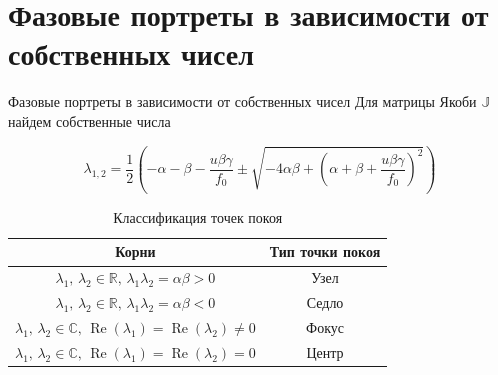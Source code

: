 \documentclass{beamer}
\begin{document}
		
	\section{Фазовые портреты в зависимости от собственных чисел}
	\begin{frame}{Фазовые портреты в зависимости от собственных чисел}
	Для матрицы Якоби $\mathbb{J}$ найдем собственные числа
\begin{block}{}
\[
	\lambda_{1,2}=\frac{1}{2}\left(-\alpha-\beta-\frac{u\beta\gamma}{f_0}\pm\sqrt{-4\alpha\beta+\left(\alpha+\beta+\frac{u\beta\gamma}{f_0}\right)^2}\right)
\]
\end{block}
\begin{table}[H]
	\centering		
		\captionsetup{labelformat=empty}
	\caption{Классификация точек покоя}
	\begin{tabular}{|c|c|}
		\hline
		Корни  & Тип точки покоя \\
		\hline
		$\lambda_1,\,\lambda_2\in\mathbb{R}\text{, } \lambda_1\lambda_2=\alpha\beta>0$& Узел\\
		\hline
		$\lambda_1,\,\lambda_2\in\mathbb{R}\text{, } \lambda_1\lambda_2=\alpha\beta<0$& Седло\\
		\hline
		$\lambda_1,\,\lambda_2\in\mathbb{C}\text{, }\operatorname{Re}(\lambda_1)=\operatorname{Re}(\lambda_2)\ne0$ & Фокус\\
		\hline
		$\lambda_1,\,\lambda_2\in\mathbb{C}\text{, }\operatorname{Re}(\lambda_1)=\operatorname{Re}(\lambda_2)=0$ & Центр\\
		\hline	
	\end{tabular}
\end{table}	
	\end{frame}
\end{document}
